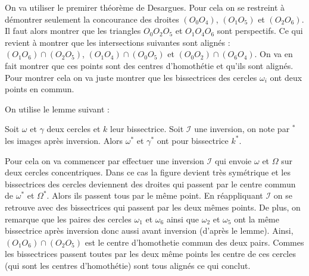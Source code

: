 \begin{sol}



On va utiliser le premirer théorème de Desargues. Pour cela on se restreint à démontrer seulement la concourance des droites $(O_0O_4)$, $(O_1O_5)$ et $(O_2O_6)$. Il faut alors montrer que les triangles $O_0O_2O_5$ et $O_1O_4O_6$ sont perspectifs. Ce qui revient à montrer que les intersections suivantes sont alignés : $(O_1O_6)\cap(O_2O_5)$, $(O_1O_4)\cap (O_0O_5)$ et $(O_0O_2)\cap (O_6O_4)$. On va en fait montrer que ces points sont des centres d'homothétie et qu'ils sont alignés. Pour montrer cela on va juste montrer que les bissectrices des cercles $\omega_i$ ont deux points en commun.

On utilise le lemme suivant : 

\begin{lem}
Soit $\omega$ et $\gamma$ deux cercles et $k$ leur bissectrice. Soit $\mathcal{I}$ une inversion, on note par $^*$ les images après inversion. Alors $\omega^*$ et $\gamma^*$ ont pour bissectrice $k^*$.
\end{lem}

Pour cela on va commencer par effectuer une inversion $\mathcal{I}$ qui envoie $\omega$ et $\Omega$ sur deux cercles concentriques. Dans ce cas la figure devient très symétrique et les bissectrices des cercles deviennent des droites qui passent par le centre commun de $\omega^*$ et $\Omega^*$. Alors ils passent tous par le même point. En réappliquant $\mathcal{I}$ on se retrouve avec des bissectrices qui passent par les deux mêmes points. De plus, on remarque que les paires des cercles $\omega_1$ et $\omega_6$ ainsi que $\omega_2$ et $\omega_5$ ont la même bissectrice après inversion donc aussi avant inversion (d'après le lemme). Ainsi, $(O_1O_6)\cap(O_2O_5)$ est le centre d'homothetie commun des deux pairs. Commes les bissectrices passent toutes par les deux même points les centre de ces cercles (qui sont les centres d'homothétie) sont tous alignés ce qui conclut.
\end{sol}

